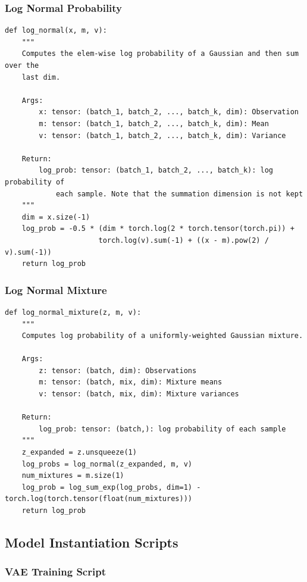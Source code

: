\documentclass{article}
\begin{document}
\subsubsection{Log Normal Probability}

\begin{verbatim}
def log_normal(x, m, v):
    """
    Computes the elem-wise log probability of a Gaussian and then sum over the
    last dim.

    Args:
        x: tensor: (batch_1, batch_2, ..., batch_k, dim): Observation
        m: tensor: (batch_1, batch_2, ..., batch_k, dim): Mean
        v: tensor: (batch_1, batch_2, ..., batch_k, dim): Variance

    Return:
        log_prob: tensor: (batch_1, batch_2, ..., batch_k): log probability of
            each sample. Note that the summation dimension is not kept
    """
    dim = x.size(-1)
    log_prob = -0.5 * (dim * torch.log(2 * torch.tensor(torch.pi)) +
                      torch.log(v).sum(-1) + ((x - m).pow(2) / v).sum(-1))
    return log_prob
\end{verbatim}

\subsubsection{Log Normal Mixture}

\begin{verbatim}
def log_normal_mixture(z, m, v):
    """
    Computes log probability of a uniformly-weighted Gaussian mixture.

    Args:
        z: tensor: (batch, dim): Observations
        m: tensor: (batch, mix, dim): Mixture means
        v: tensor: (batch, mix, dim): Mixture variances

    Return:
        log_prob: tensor: (batch,): log probability of each sample
    """
    z_expanded = z.unsqueeze(1)
    log_probs = log_normal(z_expanded, m, v)
    num_mixtures = m.size(1)
    log_prob = log_sum_exp(log_probs, dim=1) - torch.log(torch.tensor(float(num_mixtures)))
    return log_prob
\end{verbatim}

\subsection{Model Instantiation Scripts}

\subsubsection{VAE Training Script}
\end{document}

